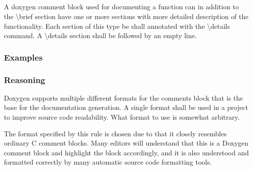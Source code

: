 \subsection*{\doxygenRule{}}

A doxygen comment block used for documenting a function can in addition to the  \textbackslash brief section have one or more sections with more detailed description of the functionality. Each section of this type be shall annotated with the \textbackslash details command. A \textbackslash details section shall be followed by an empty line.

\subsubsection*{Examples}

\noindent
\begin{minipage}[t]{0.47\textwidth}
    
\end{minipage}\hfill
\begin{minipage}[t]{0.47\textwidth}
    
\end{minipage}

\noindent
\begin{minipage}[t]{0.47\textwidth}
    
\end{minipage}\hfill

\noindent
\begin{minipage}[t]{0.47\textwidth}
    
\end{minipage}\hfill

\subsubsection*{Reasoning}

Doxygen supports multiple different formats for the comments block that is the base for the documentation generation. A single format shall be used in a project to improve source code readability. What format to use is somewhat arbitrary.

The format specified by this rule is chosen due to that it closely resembles ordinary C comment blocks. Many editors will understand that this is a Doxygen comment block and highlight the block accordingly, and it is also understood and formatted correctly by many automatic source code formatting tools.
